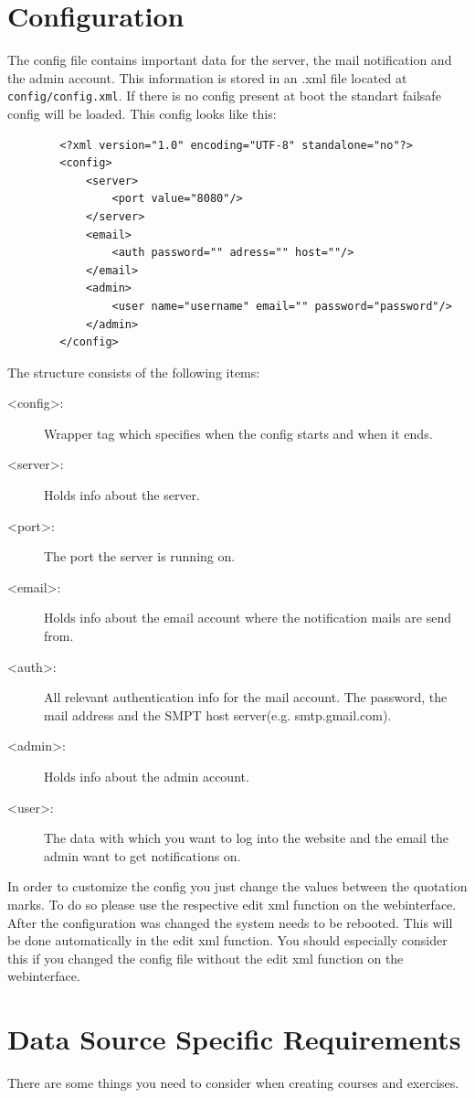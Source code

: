 \documentclass[10pt,a4paper, titlepage, toc=idx]{scrreprt}
\theoremstyle{definition}
\theoremstyle{plain}
\begin{document}
	\section{Configuration}\label{config} 
		The config file contains important data for the server, the mail 			notification and the admin account. This information is stored in 		an .xml file located at \texttt{config/config.xml}. If there is 			no config present at boot the standart failsafe config will be 				loaded. This config looks like this:
		\newpage
		\begin{lstlisting}
		<?xml version="1.0" encoding="UTF-8" standalone="no"?>
		<config>
			<server>
				<port value="8080"/>
			</server>
			<email>
				<auth password="" adress="" host=""/>
			</email>
			<admin>
				<user name="username" email="" password="password"/>
			</admin>
		</config>
	    \end{lstlisting}		   
       	The structure consists of the following items:
       	\begin{description}
        \item[<config>:] Wrapper tag which specifies when the config 					starts and when it ends.
        \item[<server>:] Holds info about the server.
        \item[<port>:] The port the server is running on.
        \item[<email>:] Holds info about the email account where the							notification mails are send from.
        \item[<auth>:] All relevant authentication info for the mail account. The password, the mail address and the SMPT host server(e.g. smtp.gmail.com).
        \item[<admin>:] Holds info about the admin account.
        \item[<user>:] The data with which you want to log into the website and the email the admin want to get notifications on.
		\end{description}
		In order to customize the config you just change the values between the quotation marks. To do so please use the respective edit xml function on the webinterface. After the configuration was changed the system needs to be rebooted. This will be done automatically in the edit xml function. You should especially consider this if you changed the config file without the edit xml function on the webinterface.
       \section{Data Source Specific Requirements}\label{dataSourceSpecific} 
        There are some things you need to consider when creating courses and exercises.
\end{document}
